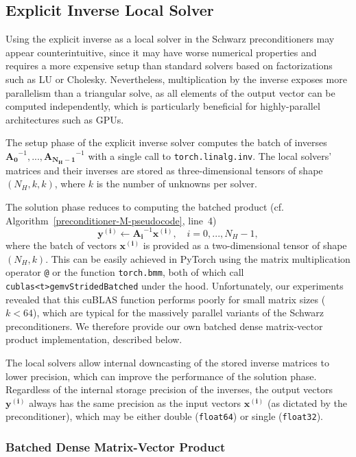 \documentclass[11pt]{article}
\theoremstyle{definition}
\theoremstyle{theorem}
\begin{document}
\subsection{Explicit Inverse Local Solver}
\label{sec:explicit-inverse-batch-solver}

Using the explicit inverse as a local solver in the Schwarz preconditioners
may appear counterintuitive, since it may have worse numerical properties and requires a more
expensive setup than standard solvers based on factorizations such as LU or Cholesky.
Nevertheless, multiplication by the inverse exposes more parallelism than
a triangular solve, as all elements of the output vector can be computed
independently, which is particularly beneficial for highly\nobreakdash-parallel architectures
such as GPUs.

The setup phase of the explicit inverse solver computes the batch of inverses
$\bm{A_0}^{-1}, ..., \bm{A_{N_H-1}}^{-1}$ with a single call to \verb|torch.linalg.inv|.
The local solvers' matrices and their inverses are stored as
three-dimensional tensors of shape $(N_H, k, k)$, where $k$ is the number of
unknowns per solver.

The solution phase reduces to computing the batched product (cf.
Algorithm~\ref{preconditioner-M-pseudocode}, line~4)
\[
  \bm{y^{(i)}}\gets \bm{A_i}^{-1}\bm{x^{(i)}},\quad i=0,...,N_H-1,
\]
where the batch of vectors $\bm{x^{(i)}}$ is provided as a two-dimensional tensor of shape
$(N_H, k)$. This can be easily achieved in PyTorch using the matrix multiplication
operator \verb|@| or the function \verb|torch.bmm|, both of which call
\verb|cublas<t>gemvStridedBatched| under the hood. Unfortunately, our
experiments revealed that this cuBLAS
function performs poorly for small matrix sizes ($k < 64$), which are typical for
the massively parallel variants of the Schwarz preconditioners. We therefore provide our own
batched dense matrix-vector product implementation, described below.

The local solvers allow internal
downcasting of the stored inverse matrices to lower precision, which can
improve the performance of the solution phase. Regardless of the internal
storage precision of the inverses, the output vectors $\bm{y^{(i)}}$
always has the same precision as the input vectors $\bm{x^{(i)}}$ (as dictated by
the preconditioner), which may be either double (\verb|float64|) or
single (\verb|float32|).

\subsubsection{Batched Dense Matrix-Vector Product}
\label{sec:batched-dense-matrix-vector-product}
\end{document}

